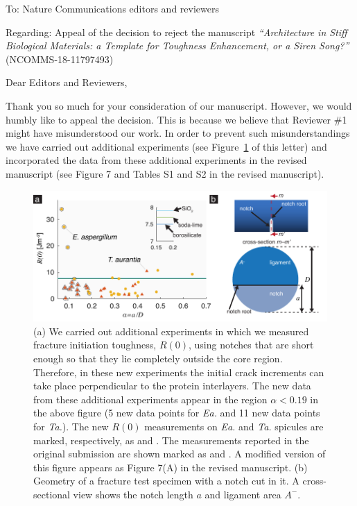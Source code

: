 \documentclass[11pt,letterpaper]{report}
\begin{document}
\thispagestyle{fancy}
\phantom{x}
\vspace{4em}

\vspace{-40pt}
To: Nature Communications editors and reviewers

Regarding: Appeal of the decision to reject the manuscript   \textit{``Architecture in Stiff Biological Materials: a Template for Toughness Enhancement, or a Siren Song?''} (NCOMMS-18-11797493)

\vspace{3em}
Dear Editors and Reviewers,
\vspace{1em}

Thank you so much for your consideration of our manuscript. However, we would humbly like to appeal the decision. This is because we believe that Reviewer \#1 might have misunderstood our work. In order to prevent such misunderstandings we have carried out additional experiments (see Figure~\ref{fig:NewData} of this letter) and incorporated the data from these additional experiments in the revised manuscript (see Figure 7 and Tables S1 and S2 in the revised manuscript). 

\begin{figure}[hb!]
	\centering
	\includegraphics[width=\textwidth]{./Figures/Figure5_V7_8.pdf}
	\caption{(a) We carried out additional experiments in which we measured fracture initiation toughness, $R(0)$, using notches that are short enough so that they lie completely outside the core region. Therefore, in these new experiments the initial crack increments can take place perpendicular to the protein interlayers. The new data from these additional experiments appear in the region $\alpha<0.19$ in the above figure (5 new data points for \textit{Ea.} and 11 new data points for \textit{Ta.}). The new $R(0)$ measurements on  \textit{Ea.}  and \textit{Ta.} spicules are marked, respectively, as  and  . The measurements reported in the original submission are shown marked as   and . A modified version of this figure appears as Figure 7(A) in the revised manuscript. (b) Geometry of a fracture test specimen with a notch cut in it. A cross-sectional view shows the notch length $a$ and ligament area $A^-$.}
	\label{fig:NewData}
\end{figure}
\end{document}

